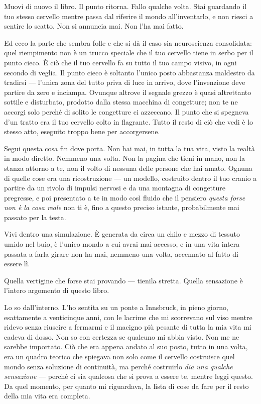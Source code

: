 \documentclass[11pt, twoside, openright]{book}
\begin{document}
Muovi di nuovo il libro. Il punto ritorna. Fallo qualche volta. Stai guardando il tuo stesso cervello mentre passa dal riferire il mondo all'inventarlo, e non riesci a sentire lo scatto. Non si annuncia mai. Non l'ha mai fatto.

Ed ecco la parte che sembra folle e che si dà il caso sia neuroscienza consolidata: quel riempimento non è un trucco speciale che il tuo cervello tiene in serbo per il punto cieco. È ciò che il tuo cervello fa su tutto il tuo campo visivo, in ogni secondo di veglia. Il punto cieco è soltanto l'unico posto abbastanza maldestro da tradirsi --- l'unica zona del tutto priva di luce in arrivo, dove l'invenzione deve partire da zero e inciampa. Ovunque altrove il segnale grezzo è quasi altrettanto sottile e disturbato, prodotto dalla stessa macchina di congetture; non te ne accorgi solo perché di solito le congetture ci azzeccano. Il punto che si spegneva d'un tratto era il tuo cervello colto in flagrante. Tutto il resto di ciò che vedi è lo stesso atto, eseguito troppo bene per accorgersene.

Segui questa cosa fin dove porta. Non hai mai, in tutta la tua vita, visto la realtà in modo diretto. Nemmeno una volta. Non la pagina che tieni in mano, non la stanza attorno a te, non il volto di nessuna delle persone che hai amato. Ognuna di quelle cose era una ricostruzione --- un modello, costruito dentro il tuo cranio a partire da un rivolo di impulsi nervosi e da una montagna di congetture pregresse, e poi presentato a te in modo così fluido che il pensiero \textit{questa forse non è la cosa reale} non ti è, fino a questo preciso istante, probabilmente mai passato per la testa.

Vivi dentro una simulazione. È generata da circa un chilo e mezzo di tessuto umido nel buio, è l'unico mondo a cui avrai mai accesso, e in una vita intera passata a farla girare non ha mai, nemmeno una volta, accennato al fatto di essere lì.

Quella vertigine che forse stai provando --- tienila stretta. Quella sensazione è l'intero argomento di questo libro.

Lo so dall'interno. L'ho sentita su un ponte a Innsbruck, in pieno giorno, esattamente a venticinque anni, con le lacrime che mi scorrevano sul viso mentre ridevo senza riuscire a fermarmi e il macigno più pesante di tutta la mia vita mi cadeva di dosso. Non so con certezza se qualcuno mi abbia visto. Non me ne sarebbe importato. Ciò che era appena andato al suo posto, tutto in una volta, era un quadro teorico che spiegava non solo come il cervello costruisce quel mondo senza soluzione di continuità, ma perché costruirlo \textit{dia una qualche sensazione} --- perché ci sia qualcosa che si prova a essere te, mentre leggi questo. Da quel momento, per quanto mi riguardava, la lista di cose da fare per il resto della mia vita era completa.
\end{document}
